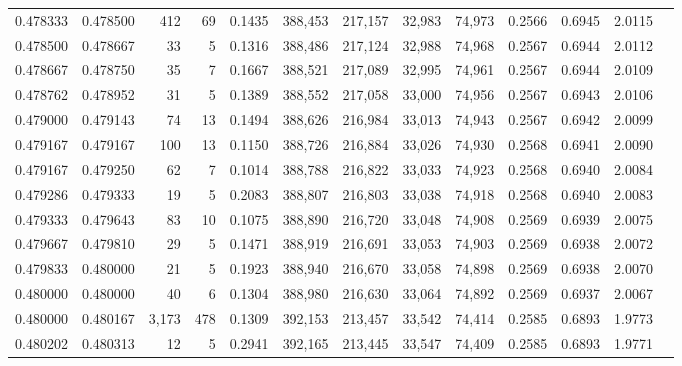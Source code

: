 \begin{tabular}{rrrrrrrrrrrrr}
0.478333 & 0.478500 &   412 &  69 &                                     0.1435 & 388,453 & 217,157 &  32,983 &  74,973 & 0.2566 & 0.6945 & 2.0115 \\
0.478500 & 0.478667 &    33 &   5 &                                     0.1316 & 388,486 & 217,124 &  32,988 &  74,968 & 0.2567 & 0.6944 & 2.0112 \\
0.478667 & 0.478750 &    35 &   7 &                                     0.1667 & 388,521 & 217,089 &  32,995 &  74,961 & 0.2567 & 0.6944 & 2.0109 \\
0.478762 & 0.478952 &    31 &   5 &                                     0.1389 & 388,552 & 217,058 &  33,000 &  74,956 & 0.2567 & 0.6943 & 2.0106 \\
0.479000 & 0.479143 &    74 &  13 &                                     0.1494 & 388,626 & 216,984 &  33,013 &  74,943 & 0.2567 & 0.6942 & 2.0099 \\
0.479167 & 0.479167 &   100 &  13 &                                     0.1150 & 388,726 & 216,884 &  33,026 &  74,930 & 0.2568 & 0.6941 & 2.0090 \\
0.479167 & 0.479250 &    62 &   7 &                                     0.1014 & 388,788 & 216,822 &  33,033 &  74,923 & 0.2568 & 0.6940 & 2.0084 \\
0.479286 & 0.479333 &    19 &   5 &                                     0.2083 & 388,807 & 216,803 &  33,038 &  74,918 & 0.2568 & 0.6940 & 2.0083 \\
0.479333 & 0.479643 &    83 &  10 &                                     0.1075 & 388,890 & 216,720 &  33,048 &  74,908 & 0.2569 & 0.6939 & 2.0075 \\
0.479667 & 0.479810 &    29 &   5 &                                     0.1471 & 388,919 & 216,691 &  33,053 &  74,903 & 0.2569 & 0.6938 & 2.0072 \\
0.479833 & 0.480000 &    21 &   5 &                                     0.1923 & 388,940 & 216,670 &  33,058 &  74,898 & 0.2569 & 0.6938 & 2.0070 \\
0.480000 & 0.480000 &    40 &   6 &                                     0.1304 & 388,980 & 216,630 &  33,064 &  74,892 & 0.2569 & 0.6937 & 2.0067 \\
0.480000 & 0.480167 & 3,173 & 478 &                                     0.1309 & 392,153 & 213,457 &  33,542 &  74,414 & 0.2585 & 0.6893 & 1.9773 \\
0.480202 & 0.480313 &    12 &   5 &                                     0.2941 & 392,165 & 213,445 &  33,547 &  74,409 & 0.2585 & 0.6893 & 1.9771 \\

\end{tabular}
